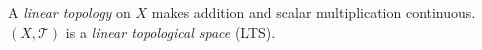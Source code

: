 A \emph{linear topology} on $X$ makes addition and scalar multiplication continuous. $(X,\mathcal{T})$ is a \emph{linear topological space} (LTS).
